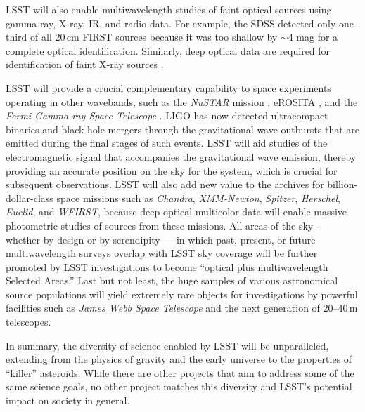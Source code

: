 LSST will also enable multiwavelength studies of faint optical
sources using gamma-ray, X-ray, IR, and radio data.  For example, the
SDSS detected only one-third of all 20\,cm FIRST sources \citep{1995ApJ...450..559B}
because it was too shallow by $\sim$4 mag for a complete optical
identification. Similarly, deep optical data are required for
identification of faint X-ray sources \citep{2005ARA&A..43..827B,2017AN....338..241B}.

LSST will provide a crucial complementary capability to space
experiments operating in other wavebands, such as the
\textit{NuSTAR} mission \citep{2013ApJ...770..103H},
eROSITA \citep{2012arXiv1209.3114M},
and the \textit{Fermi
Gamma-ray Space Telescope} \cite[e.g.,][]{2009ApJ...697.1071A}.
LIGO has now detected ultracompact binaries and black hole mergers through the
gravitational wave outbursts that are emitted during the final stages of such events.
LSST will aid studies of  the electromagnetic signal that accompanies the gravitational wave emission,
thereby providing an accurate position on the sky for the system, which is
crucial for subsequent observations. LSST will also add new value to the archives for
billion-dollar-class space missions such as \textit{Chandra}, \textit{XMM-Newton},
\textit{Spitzer}, \textit{Herschel}, \textit{Euclid}, and \textit{WFIRST},
because deep optical multicolor data will enable
massive photometric  studies of sources from these missions.
All areas of the sky --- whether by design or by serendipity --- in which past, present, or future
multiwavelength surveys overlap with LSST sky coverage will be further promoted by LSST
investigations to become ``optical plus multiwavelength Selected Areas.''
Last but not least, the huge samples of various astronomical source
populations will yield extremely rare objects for investigations by powerful
facilities such as \textit{James Webb Space Telescope} \citep{2006SSRv..123..485G} and the next generation
of 20--40\,m telescopes.

In summary, the diversity of science enabled by LSST will be
unparalleled, extending from the physics of gravity and the
early universe to the properties of ``killer'' asteroids. While
there are other projects that aim to address some of the same
science goals, no other project matches this diversity and
LSST's potential impact on society in general.
